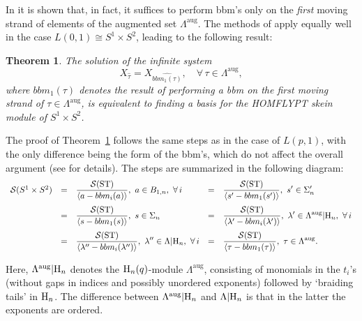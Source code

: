 \documentclass[11pt]{amsart}
\newtheorem{thm}{Theorem}
\begin{document}
\smallskip

In \cite{DL4} it is shown that, in fact, it suffices to perform bbm's only on the \textit{first} moving strand of elements of the augmented set \(\Lambda^{\text{aug}}\). The methods of \cite{DLP, DL4} apply equally well in the case \(L(0,1) \cong S^1 \times S^2\), leading to the following result:

\begin{thm}\label{dlnew}
The solution of the infinite system
\[
X_{\widehat{\tau}} = X_{\widehat{bbm_1(\tau)}}, \quad \forall\, \tau \in \Lambda^{\text{aug}},
\]
where \(bbm_1(\tau)\) denotes the result of performing a bbm on the first moving strand of \(\tau \in \Lambda^{\text{aug}}\), is equivalent to finding a basis for the HOMFLYPT skein module of \(S^1 \times S^2\).
\end{thm}

The proof of Theorem~\ref{dlnew} follows the same steps as in the case of \(L(p,1)\), with the only difference being the form of the bbm's, which do not affect the overall argument (see \cite{DLP, DL4} for details). The steps are summarized in the following diagram:
\[
\begin{array}{llllll}
\mathcal{S}(S^1 \times S^2) & = & \displaystyle\frac{\mathcal{S}({\rm ST})}{\langle a - bbm_i(a) \rangle},\ a\in B_{1,n},\ \forall\, i
& = & \displaystyle\frac{\mathcal{S}({\rm ST})}{\langle s^{\prime} - bbm_1(s^{\prime}) \rangle},\ s^{\prime}\in \Sigma_n^{\prime} \\[12pt]

& = & \displaystyle\frac{\mathcal{S}({\rm ST})}{\langle s - bbm_1(s) \rangle},\ s\in \Sigma_n
& = & \displaystyle\frac{\mathcal{S}({\rm ST})}{\langle \lambda^{\prime} - bbm_i(\lambda^{\prime}) \rangle},\ \lambda^{\prime} \in \Lambda^{\text{aug}}|{\rm H}_n,\ \forall\, i \\[12pt]

& = & \displaystyle\frac{\mathcal{S}({\rm ST})}{\langle \lambda^{\prime\prime} - bbm_i(\lambda^{\prime\prime}) \rangle},\ \lambda^{\prime\prime}\in \Lambda|{\rm H}_n,\ \forall\, i
& = & \displaystyle\frac{\mathcal{S}({\rm ST})}{\langle \tau - bbm_1(\tau) \rangle},\ \tau\in \Lambda^{\text{aug}}.
\end{array}
\]

\noindent Here, \(\Lambda^{\text{aug}}|{\rm H}_n\) denotes the \({\rm H}_n(q)\)-module \(\Lambda^{\text{aug}}\), consisting of monomials in the \(t_i\)'s (without gaps in indices and possibly unordered exponents) followed by `braiding tails' in \({\rm H}_n\). The difference between \(\Lambda^{\text{aug}}|{\rm H}_n\) and \(\Lambda|{\rm H}_n\) is that in the latter the exponents are ordered.
\end{document}
